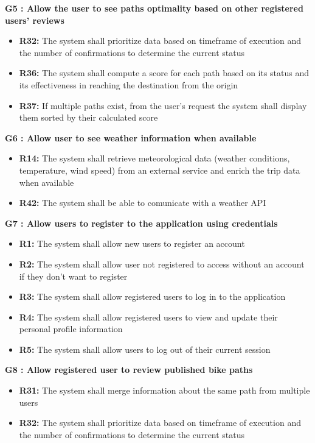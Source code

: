 \textbf{G5 : Allow the user to see paths optimality based on other registered users' reviews}
\begin{itemize}
    \item \textbf{R32:} The system shall prioritize data based on timeframe of execution and the number of confirmations to determine the current status
    \item \textbf{R36:} The system shall compute a score for each path based on its status and its effectiveness in reaching the destination from the origin
    \item \textbf{R37:} If multiple paths exist, from the user's request the system shall display them sorted by their calculated score
\end{itemize}
\vspace{1cm}

\textbf{G6 : Allow user to see weather information when available}
\begin{itemize}
    \item \textbf{R14:} The system shall retrieve meteorological data (weather conditions, temperature, wind speed) from an external service and enrich the trip data when available
    \item \textbf{R42:} The system shall be able to comunicate with a weather API
\end{itemize}
\vspace{1cm}

\textbf{G7 : Allow users to register to the application using credentials}
\begin{itemize}
    \item \textbf{R1:} The system shall allow new users to register an account
    \item \textbf{R2:} The system shall allow user not registered to access without an account if they don't want to register
    \item \textbf{R3:} The system shall allow registered users to log in to the application
    \item \textbf{R4:} The system shall allow registered users to view and update their personal profile information
    \item \textbf{R5:} The system shall allow users to log out of their current session
\end{itemize}
\vspace{1cm}

\textbf{G8 : Allow registered user to review published bike paths}
\begin{itemize}
    \item \textbf{R31:} The system shall merge information about the same path from multiple users
    \item \textbf{R32:} The system shall prioritize data based on timeframe of execution and the number of confirmations to determine the current status
\end{itemize}
\vspace{1cm}

